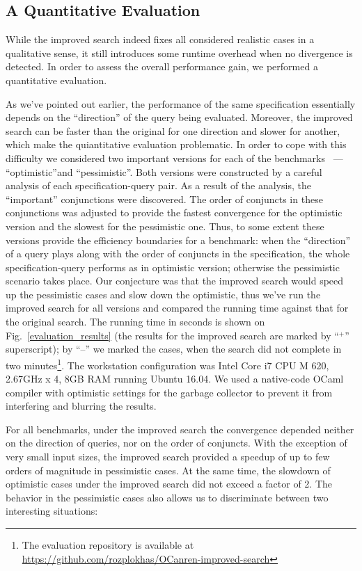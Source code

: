 \subsection{A Quantitative Evaluation}



While the improved search indeed fixes all considered realistic cases in a qualitative sense, it still introduces some runtime
overhead when no divergence is detected. In order to assess the overall performance gain, we performed a quantitative
evaluation.

As we've pointed out earlier, the performance of the same specification essentially depends on the ``direction'' of
the query being evaluated. Moreover, the improved search can be faster than the original for one direction and
slower for another, which make the quiantitative evaluation problematic. In order to cope with this difficulty we
considered two important versions for each of the benchmarks ~--- ``optimistic''and ``pessimistic''.
Both versions were constructed by a careful analysis of each specification-query pair. As a result of the
analysis, the ``important'' conjunctions were discovered. The order of conjuncts in these conjunctions was adjusted to provide
the fastest convergence for the optimistic version and the slowest for the pessimistic one. Thus, to some extent these
versions provide the efficiency boundaries for a benchmark: when the ``direction'' of a query plays along with the
order of conjuncts in the specification, the whole specification-query performs as in optimistic version; otherwise
the pessimistic scenario takes place. Our conjecture was that the improved search would speed up the pessimistic
cases and slow down the optimistic, thus we've run the improved search for all versions and compared the running time
against that for the original search. The running time in seconds is shown on Fig.~\ref{evaluation_results} (the results
for the improved search are marked by ``$^+$'' superscript); by ``--'' we marked the cases, when the search did not
complete in two minutes\footnote{The evaluation repository is available at \url{https://github.com/rozplokhas/OCanren-improved-search}}. The workstation configuration was Intel Core i7 CPU M 620, 2.67GHz x 4, 8GB RAM running Ubuntu 16.04. We used a
native-code OCaml compiler with optimistic settings for the garbage collector to prevent it from interfering and blurring the
results.

For all benchmarks, under the improved search the convergence depended neither on the direction of queries, nor on the
order of conjuncts. With the exception of very small input sizes, the improved search provided a speedup of up to
few orders of magnitude in pessimistic cases. At the same time, the slowdown of optimistic cases under
the improved search did not exceed a factor of 2. The behavior in the pessimistic cases also allows us to discriminate
between two interesting situations:

